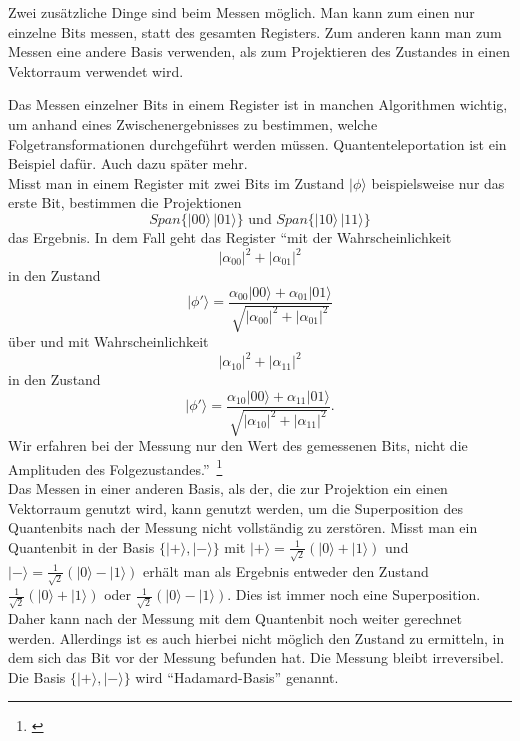Zwei zusätzliche Dinge sind beim Messen möglich. Man kann zum einen nur einzelne Bits messen, statt des gesamten Registers. Zum anderen kann man zum Messen eine andere Basis verwenden, als zum Projektieren des Zustandes in einen Vektorraum verwendet wird. 

Das Messen einzelner Bits in einem Register ist in manchen Algorithmen wichtig, um anhand eines Zwischenergebnisses zu bestimmen, welche Folgetransformationen durchgeführt werden müssen. Quantenteleportation ist ein Beispiel dafür. Auch dazu später mehr.\\

Misst man in einem Register mit zwei Bits im Zustand $\left|\phi\right.\rangle$ beispielsweise nur das erste Bit, bestimmen die Projektionen 
$$Span\{\left|00\right.\rangle\,\left|01\right.\rangle\} \text{ und }Span\{\left|10\right.\rangle\,\left|11\right.\rangle\}$$ das Ergebnis.
In dem Fall geht das Register ``mit der Wahrscheinlichkeit
$$\left|\alpha_{00}\right|^2+\left|\alpha_{01}\right|^2$$
in den Zustand 
$$\left|\phi'\right.\rangle=\frac{\alpha_{00}\left|00\right.\rangle+\alpha_{01}\left|01\right.\rangle}{\sqrt{\left|\alpha_{00}\right|^2+\left|\alpha_{01}\right|^2}}$$
über und mit Wahrscheinlichkeit
$$\left|\alpha_{10}\right|^2+\left|\alpha_{11}\right|^2$$
in den Zustand 
$$\left|\phi'\right.\rangle=\frac{\alpha_{10}\left|00\right.\rangle+\alpha_{11}\left|01\right.\rangle}{\sqrt{\left|\alpha_{10}\right|^2+\left|\alpha_{11}\right|^2}}.$$
Wir erfahren bei der Messung nur den Wert des gemessenen Bits, nicht
die Amplituden des Folgezustandes.''\ \footnote{\cite[S. 47]{homeister_quantum_2022}}\\

Das Messen in einer anderen Basis, als der, die zur Projektion ein einen Vektorraum genutzt wird, kann genutzt werden, um die Superposition des Quantenbits nach der Messung nicht vollständig zu zerstören. 
Misst man ein Quantenbit in der Basis $\{\left|+\right.\rangle,\left|-\right.\rangle\}$ mit $\left|+\right.\rangle=\frac{1}{\sqrt{2}}\left(\left|0\right.\rangle+\left|1\right.\rangle\right)$ und $\left|-\right.\rangle=\frac{1}{\sqrt{2}}\left(\left|0\right.\rangle-\left|1\right.\rangle\right)$ erhält man als Ergebnis entweder den Zustand $\frac{1}{\sqrt{2}}\left(\left|0\right.\rangle+\left|1\right.\rangle\right)$ oder $\frac{1}{\sqrt{2}}\left(\left|0\right.\rangle-\left|1\right.\rangle\right)$. Dies ist immer noch eine Superposition. Daher kann nach der Messung mit dem Quantenbit noch weiter gerechnet werden. Allerdings ist es auch hierbei nicht möglich den Zustand zu ermitteln, in dem sich das Bit vor der Messung befunden hat. Die Messung bleibt irreversibel. Die Basis $\{\left|+\right.\rangle,\left|-\right.\rangle\}$ wird ``Hadamard-Basis'' genannt.\\\newpage

